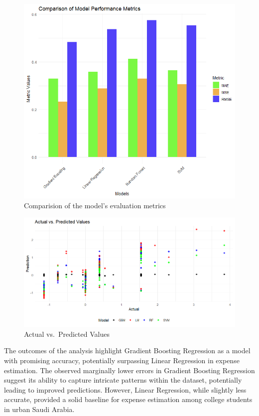 \documentclass[
]{article}
\begin{document}
\begin{figure}
\centering
\includegraphics{Rplot.png}
\caption{Comparision of the model's evaluation metrics}
\end{figure}

\begin{figure}
\centering
\includegraphics{idk.png}
\caption{Actual vs.~Predicted Values}
\end{figure}

The outcomes of the analysis highlight Gradient Boosting Regression as a
model with promising accuracy, potentially surpassing Linear Regression
in expense estimation. The observed marginally lower errors in Gradient
Boosting Regression suggest its ability to capture intricate patterns
within the dataset, potentially leading to improved predictions.
However, Linear Regression, while slightly less accurate, provided a
solid baseline for expense estimation among college students in urban
Saudi Arabia.
\end{document}
